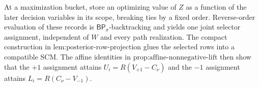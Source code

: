 At a maximization bucket, store an optimizing value of \(Z\) as a function of the later decision variables in its scope, breaking ties by a fixed order.  Reverse-order evaluation of these records is \(\mathsf{BP}_\sigma\)-backtracking and yields one joint selector assignment, independent of \(W\) and every path realization.  The compact construction in \(\text{lem:posterior-row-projection}\) glues the selected rows into a compatible SCM.  The affine identities in \(\text{prop:affine-nonnegative-lift}\) then show that the \(+1\) assignment attains \(U_i=R(V_{+1}-C_\nu)\) and the \(-1\) assignment attains \(L_i=R(C_\nu-V_{-1})\).